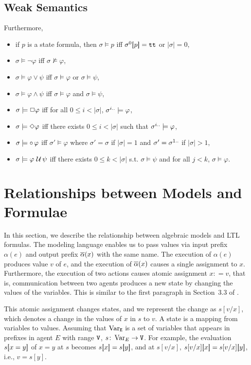 \documentclass[12pt,a4paper,titlepage]{article}
\theoremstyle{break}
\begin{document}
\subsection{Weak Semantics}
Furthermore,
  \begin{itemize}
\item if $p$ is a state formula, then \(\sigma\models p\) iff \(\sigma^0\lsquarebracket p\rsquarebracket=\true\) or \(|\sigma| =0\),
\item \(\sigma\models\neg\varphi\) iff \(\sigma\not\models\varphi\),
\item \(\sigma\models\varphi\vee\psi\) iff \(\sigma\models\varphi\) or \(\sigma\models\psi\),
\item \(\sigma\models\varphi\wedge\psi\) iff \(\sigma\models\varphi\) and \(\sigma\models\psi\),
\item \(\sigma\models\ltlbox\varphi\) iff for all \(0\leq i<|\sigma|\), \(\suffix{\sigma}{i}\models\varphi\),
\item \(\sigma\models\ltldiammond\varphi\) iff there exists \(0\leq i<|\sigma|\) such that \(\suffix{\sigma}{i}\models\varphi\),
\item \(\sigma\models\ltlnext\varphi\) iff \(\sigma'\models\varphi\) where \(\sigma'=\sigma\) if \(|\sigma|=1\) and \(\sigma'=\suffix{\sigma}{1}\) if \(|\sigma|>1\),
\item \(\sigma\models\varphi\ltluntil\psi\) iff there exists \(0\leq k<|\sigma|\) s.t. \(\sigma\models\psi\) and for all \(j<k\), \(\sigma\models\varphi\).
  \end{itemize}
%
%
\section{Relationships between Models and Formulae}
In this section, we describe the relationship between algebraic models and LTL formulas.
The modeling language enables us to pass values via input prefix \(\alpha(e)\) and output prefix \(\bijection{\alpha}(x)\) with the same name.
The execution of \(\alpha(e)\) produces  value \(v\) of \(e\), and  the execution of \(\bijection{\alpha}(x)\) causes a single assignment to \(x\).
Furthermore, the execution of two actions causes atomic assignment \(x \colon = v\), that is, communication between two agents produces a new state by changing the values of the variables.
This is similar to the first paragraph in Section~3.3 of \cite[page 290]{lamport84hoare}.

This atomic assignment changes states, and  we represent the change as \(s[v/x]\), which denotes a change in the values of \(x\) in \(s\) to \(v\).
A state is a mapping from variables to values.
Assuming that \(\tt \Var_E\) is a set of variables that appears in prefixes in agent \(E\) with range \(\tt V\), \(s\colon \Var_E\rightarrow {\tt V}\).
For example, the evaluation \(s\lsquarebracket x=y\rsquarebracket\) of \(x=y\) at \(s\) becomes \(s\lsquarebracket x\rsquarebracket=s\lsquarebracket y\rsquarebracket\), and at \(s[v/x]\), \(s[v/x]\lsquarebracket x\rsquarebracket=s[v/x]\lsquarebracket y\rsquarebracket\), i.e., \(v=s[y]\).
\end{document}
